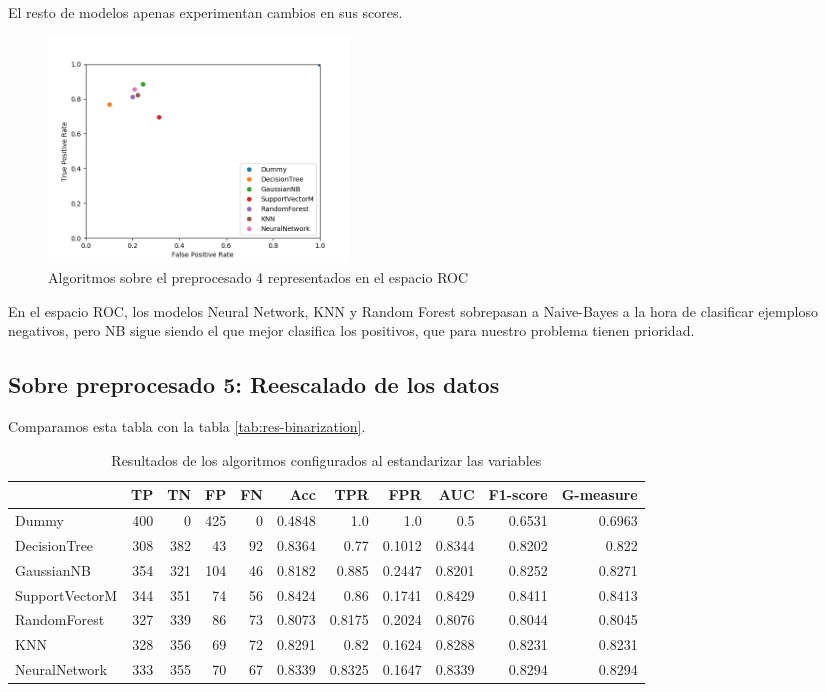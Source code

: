 \documentclass{article}
\begin{document}
El resto de modelos apenas experimentan cambios en sus scores.

\begin{figure}[H]
  \centering
  \label{fig:roc4}
  \caption{Algoritmos sobre el preprocesado 4 representados en el espacio ROC}
  \includegraphics[width=80mm]{figures/roc4}
\end{figure}

En el espacio ROC, los modelos Neural Network, KNN y Random Forest
sobrepasan a Naive-Bayes a la hora de clasificar ejemploso negativos,
pero NB sigue siendo el que mejor clasifica los positivos, que para
nuestro problema tienen prioridad.

\subsection{Sobre preprocesado 5: Reescalado de los datos}

Comparamos esta tabla con la tabla \ref{tab:res-binarization}.

\begin{table}[H]
\centering
\caption{Resultados de los algoritmos configurados al estandarizar las
  variables}
\label{tab:res-stdScaler}
\begin{tabular}{|lrrrrrrrrrr|}
\hline
 & TP & TN & FP & FN & Acc & TPR & FPR & AUC & F1-score & G-measure\\ \hline
Dummy & 400 & 0 & 425 & 0 & 0.4848 & 1.0 & 1.0 & 0.5 & 0.6531 & 0.6963\\
DecisionTree & 308 & 382 & 43 & 92 & 0.8364 & 0.77 & 0.1012 & 0.8344 & 0.8202 & 0.822\\
GaussianNB & 354 & 321 & 104 & 46 & 0.8182 & 0.885 & 0.2447 & 0.8201 & 0.8252 & 0.8271\\
SupportVectorM & 344 & 351 & 74 & 56 & 0.8424 & 0.86 & 0.1741 & 0.8429 & 0.8411 & 0.8413\\
RandomForest & 327 & 339 & 86 & 73 & 0.8073 & 0.8175 & 0.2024 & 0.8076 & 0.8044 & 0.8045\\
KNN & 328 & 356 & 69 & 72 & 0.8291 & 0.82 & 0.1624 & 0.8288 & 0.8231 & 0.8231\\
NeuralNetwork & 333 & 355 & 70 & 67 & 0.8339 & 0.8325 & 0.1647 & 0.8339 & 0.8294 & 0.8294\\
\hline
\end{tabular}
\end{table}
\end{document}
